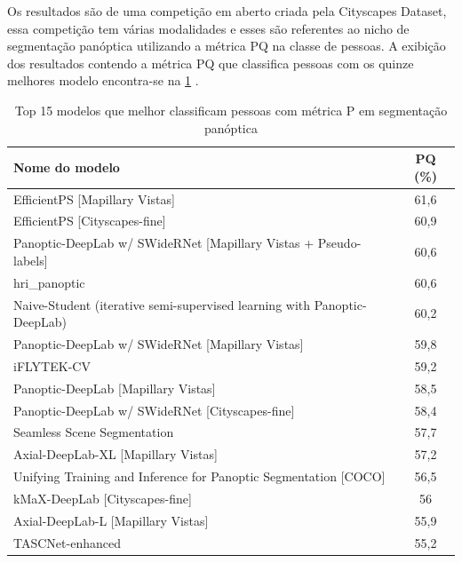 
Os resultados são de uma competição em aberto criada pela Cityscapes Dataset, essa competição tem várias modalidades e esses são referentes ao nicho de segmentação panóptica utilizando a métrica PQ na classe de pessoas. A exibição dos resultados contendo a métrica PQ que classifica pessoas com os quinze melhores modelo encontra-se na \cref{tab:resultados-cityscapes} \space\cite{datasetResults}.
\begin{table}[h]
	\centering
	\caption{Top 15 modelos que melhor classificam pessoas com métrica P em segmentação panóptica}
	\label{tab:resultados-cityscapes}
	\begin{tabular}{|l|c|}
	  \hline
	  Nome do modelo & PQ (\%) \\
	  \hline
	  EfficientPS [Mapillary Vistas] & 61,6 \\
	  EfficientPS [Cityscapes-fine] & 60,9 \\
	  Panoptic-DeepLab w/ SWideRNet [Mapillary Vistas + Pseudo-labels] & 60,6 \\
	  hri\_panoptic & 60,6 \\
	  Naive-Student (iterative semi-supervised learning with Panoptic-DeepLab) & 60,2 \\
	  Panoptic-DeepLab w/ SWideRNet [Mapillary Vistas] & 59,8 \\
	  iFLYTEK-CV & 59,2 \\
	  Panoptic-DeepLab [Mapillary Vistas] & 58,5 \\
	  Panoptic-DeepLab w/ SWideRNet [Cityscapes-fine] & 58,4 \\
	  Seamless Scene Segmentation & 57,7 \\
	  Axial-DeepLab-XL [Mapillary Vistas] & 57,2 \\
	  Unifying Training and Inference for Panoptic Segmentation [COCO] & 56,5 \\
	  kMaX-DeepLab [Cityscapes-fine] & 56 \\
	  Axial-DeepLab-L [Mapillary Vistas] & 55,9 \\
	  TASCNet-enhanced & 55,2 \\
	  \hline
	\end{tabular}
  \end{table}




